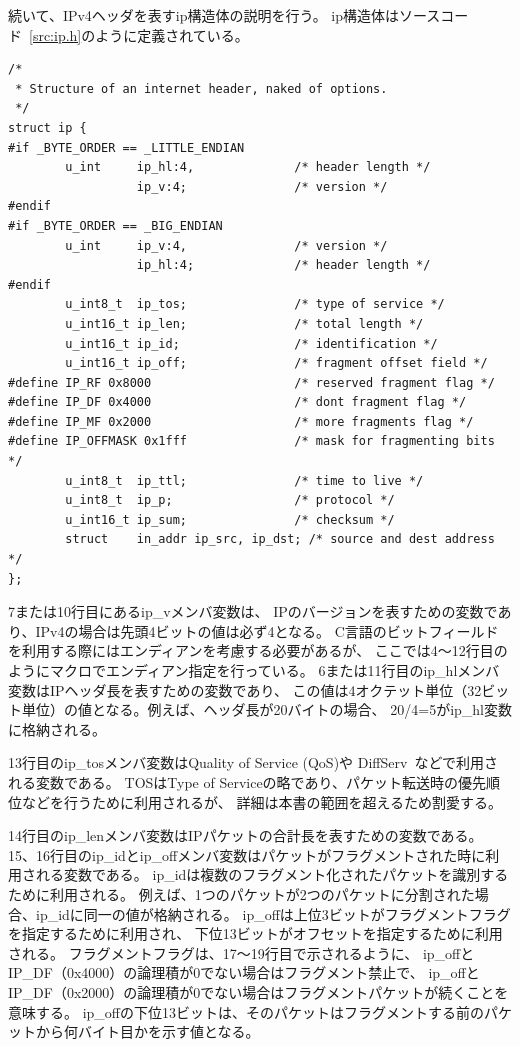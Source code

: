 続いて、IPv4ヘッダを表すip構造体の説明を行う。
ip構造体はソースコード~\ref{src:ip.h}のように定義されている。
\begin{lstlisting}[caption=IPv4ヘッダ定義 (/usr/include/netinet/ip.h),label=src:ip.h]
/*
 * Structure of an internet header, naked of options.
 */
struct ip {
#if _BYTE_ORDER == _LITTLE_ENDIAN
        u_int     ip_hl:4,              /* header length */
                  ip_v:4;               /* version */
#endif
#if _BYTE_ORDER == _BIG_ENDIAN
        u_int     ip_v:4,               /* version */
                  ip_hl:4;              /* header length */
#endif
        u_int8_t  ip_tos;               /* type of service */
        u_int16_t ip_len;               /* total length */
        u_int16_t ip_id;                /* identification */
        u_int16_t ip_off;               /* fragment offset field */
#define IP_RF 0x8000                    /* reserved fragment flag */
#define IP_DF 0x4000                    /* dont fragment flag */
#define IP_MF 0x2000                    /* more fragments flag */
#define IP_OFFMASK 0x1fff               /* mask for fragmenting bits */
        u_int8_t  ip_ttl;               /* time to live */
        u_int8_t  ip_p;                 /* protocol */
        u_int16_t ip_sum;               /* checksum */
        struct    in_addr ip_src, ip_dst; /* source and dest address */
};
\end{lstlisting}
7または10行目にあるip\_vメンバ変数は、
IPのバージョンを表すための変数であり、IPv4の場合は先頭4ビットの値は必ず4となる。
C言語のビットフィールドを利用する際にはエンディアンを考慮する必要があるが、
ここでは4〜12行目のようにマクロでエンディアン指定を行っている。
6または11行目のip\_hlメンバ変数はIPヘッダ長を表すための変数であり、
この値は4オクテット単位（32ビット単位）の値となる。例えば、ヘッダ長が20バイトの場合、
20/4=5がip\_hl変数に格納される。

13行目のip\_tosメンバ変数はQuality of Service (QoS)や
DiffServ~\cite{RFC2474}などで利用される変数である。
TOSはType of Serviceの略であり、パケット転送時の優先順位などを行うために利用されるが、
詳細は本書の範囲を超えるため割愛する。

14行目のip\_lenメンバ変数はIPパケットの合計長を表すための変数である。
15、16行目のip\_idとip\_offメンバ変数はパケットがフラグメントされた時に利用される変数である。
ip\_idは複数のフラグメント化されたパケットを識別するために利用される。
例えば、1つのパケットが2つのパケットに分割された場合、ip\_idに同一の値が格納される。
ip\_offは上位3ビットがフラグメントフラグを指定するために利用され、
下位13ビットがオフセットを指定するために利用される。
フラグメントフラグは、17〜19行目で示されるように、
ip\_offとIP\_DF（0x4000）の論理積が0でない場合はフラグメント禁止で、
ip\_offとIP\_DF（0x2000）の論理積が0でない場合はフラグメントパケットが続くことを意味する。
ip\_offの下位13ビットは、そのパケットはフラグメントする前のパケットから何バイト目かを示す値となる。

